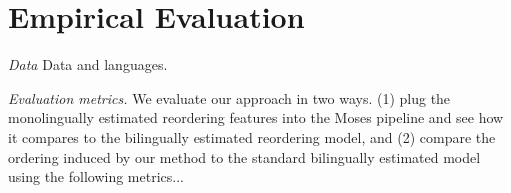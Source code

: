 \documentclass[11pt,letterpaper]{article}
\newcommand{\paraheader}[1]{\vskip 0.05in \noindent\emph{#1}}
\begin{document}
\section{Empirical Evaluation} \label{sect:eval}

\paraheader{Data} Data and languages.

\paraheader{Evaluation metrics.}  We evaluate our approach in two ways.  (1) plug the monolingually estimated reordering features into the Moses pipeline and see how it compares to the bilingually estimated reordering model, and (2) compare the ordering induced by our method to the standard bilingually estimated model using the following metrics...





\end{document}
